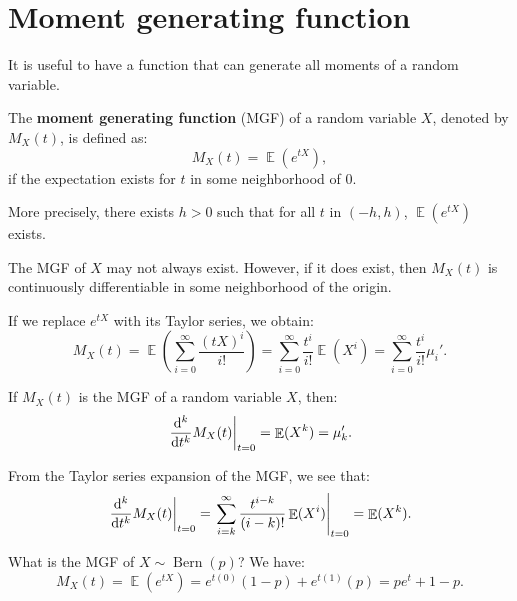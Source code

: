 \documentclass{huhtakm-template-book-v2}
\DeclareMathOperator{\E}{\mathbb{E}}
\DeclareMathOperator{\Bern}{Bern}
\begin{document}
\section{Moment generating function}
    It is useful to have a function that can generate all moments of a random variable.
    \begin{defn}
        The \textbf{moment generating function} (MGF) of a random variable $X$, denoted by $M_{X}(t)$, is defined as:
        \begin{equation*}
            M_{X}(t) = \E(e^{tX}),
        \end{equation*}
        if the expectation exists for $t$ in some neighborhood of $0$.
    \end{defn}
    \begin{rem}
        More precisely, there exists $h > 0$ such that for all $t$ in $(-h, h)$, $\E(e^{tX})$ exists.
    \end{rem}
    \begin{rem}
        The MGF of $X$ may not always exist. However, if it does exist, then $M_{X}(t)$ is continuously differentiable in some neighborhood of the origin.
    \end{rem}
    \begin{rem}
        If we replace $e^{tX}$ with its Taylor series, we obtain:
        \begin{equation*}
            M_{X}(t) = \E\left(\sum_{i=0}^{\infty} \frac{(tX)^{i}}{i!}\right) = \sum_{i=0}^{\infty} \frac{t^{i}}{i!} \E(X^{i}) = \sum_{i=0}^{\infty} \frac{t^{i}}{i!} \mu_{i}'.
        \end{equation*}
    \end{rem}
    \begin{lem}
        If $M_{X}(t)$ is the MGF of a random variable $X$, then:
        \begin{equation*}
            \left.\odv*[order={k}]{M_{X}(t)}{t}\right|_{t=0} = \E(X^{k}) = \mu_{k}'.
        \end{equation*}
    \end{lem}
    \begin{proofing}
        From the Taylor series expansion of the MGF, we see that:
        \begin{equation*}
            \left.\odv*[order={k}]{M_{X}(t)}{t}\right|_{t=0} = \left.\sum_{i=k}^{\infty} \frac{t^{i-k}}{(i-k)!} \E(X^{i})\right|_{t=0} = \E(X^{k}).
        \end{equation*}
    \end{proofing}
    \begin{eg}
        What is the MGF of $X \sim \Bern(p)$? We have:
        \begin{equation*}
            M_{X}(t) = \E(e^{tX}) = e^{t(0)}(1 - p) + e^{t(1)}(p) = p e^{t} + 1 - p.
        \end{equation*}
    \end{eg}
	\newpage
\end{document}
